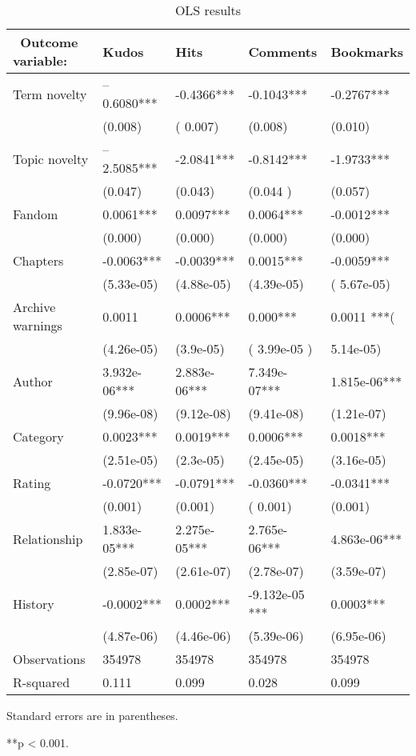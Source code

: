 \documentclass[a4paper]{article}
\begin{document}
 \begin{table}
\centering
\begin{tabular}[width=0.8\textwidth]{p{3cm}p{3cm}p{3cm}p{3cm}p{3cm}}
\toprule
\ Outcome variable: & Kudos & Hits & Comments & Bookmarks \\ 
   \hline			
Term novelty & --0.6080***&  -0.4366***  & -0.1043*** & -0.2767*** \\
& (0.008) & ( 0.007) & (0.008) & (0.010)\\
Topic novelty & --2.5085*** & -2.0841*** & -0.8142*** & -1.9733*** \\
& (0.047) & (0.043) &  (0.044 ) & (0.057)\\
Fandom & 0.0061*** & 0.0097*** & 0.0064*** & -0.0012*** \\
& (0.000) & (0.000) & (0.000) & (0.000)\\
Chapters & -0.0063***& -0.0039*** & 0.0015***& -0.0059*** \\
& (5.33e-05) & (4.88e-05) & (4.39e-05) & ( 5.67e-05) \\
Archive warnings & 0.0011 & 0.0006*** & 0.000***& 0.0011 ***(\\
& (4.26e-05) & (3.9e-05) & ( 3.99e-05 ) & 5.14e-05)\\
Author & 3.932e-06*** & 2.883e-06***& 7.349e-07*** & 1.815e-06***\\
& (9.96e-08) & (9.12e-08) & (9.41e-08) & (1.21e-07)\\
Category & 0.0023***& 0.0019***& 0.0006*** & 0.0018***\\
& (2.51e-05)  & (2.3e-05)  & (2.45e-05) & (3.16e-05)\\ 
Rating & -0.0720*** & -0.0791***& -0.0360*** & -0.0341***\\
& (0.001) & (0.001) & ( 0.001) & (0.001) \\
Relationship & 1.833e-05*** & 2.275e-05***&  2.765e-06*** & 4.863e-06***\\
& (2.85e-07) & (2.61e-07) & (2.78e-07) & (3.59e-07) \\
History & -0.0002***& 0.0002*** & -9.132e-05 ***& 0.0003***\\
& (4.87e-06) & (4.46e-06) & (5.39e-06) & (6.95e-06)\\
\hline 
Observations & 354978 & 354978 & 354978 & 354978 \\
R-squared & 0.111 & 0.099 & 0.028 & 0.099\\
\bottomrule
\end{tabular}
 \begin{tablenotes}
      \small
      \item Standard errors are in parentheses.
      \item ***p < 0.001.
       \end{tablenotes}
\caption{OLS results}
\label{tab:regression}
\end{table}%
\end{document}
